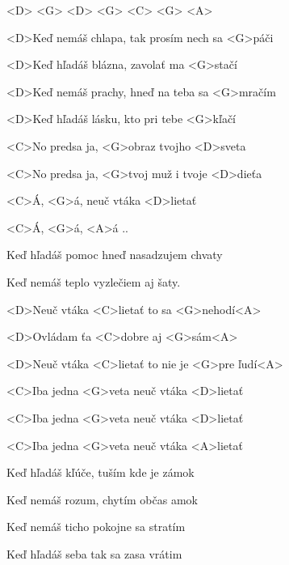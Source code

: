 

\zs
<D> <G> <D> <G> <C> <G> <A>

<D>Keď nemáš chlapa, tak prosím nech sa <G>páči

<D>Keď hľadáš blázna, zavolať ma <G>stačí

<D>Keď nemáš prachy, hneď na teba sa <G>mračím

<D>Keď hľadáš lásku, kto pri tebe <G>kľačí
\ks

\zr
<C>No predsa ja, <G>obraz tvojho <D>sveta

<C>No predsa ja, <G>tvoj muž i tvoje <D>dieťa

<C>Á, <G>á, neuč vtáka <D>lietať

<C>Á, <G>á, <A>á ..
\kr

\zs
Keď hľadáš pomoc hneď nasadzujem chvaty

Keď nemáš teplo vyzlečiem aj šaty.
\ks

\zr
<D>Neuč vtáka <C>lietať to sa <G>nehodí<A> 

<D>Ovládam ťa <C>dobre aj <G>sám<A>

<D>Neuč vtáka <C>lietať to nie je <G>pre ľudí<A> 

<C>Iba jedna <G>veta neuč vtáka <D>lietať

<C>Iba jedna <G>veta neuč vtáka <D>lietať

<C>Iba jedna <G>veta neuč vtáka <A>lietať
\kr

\zs
Keď hľadáš kľúče, tuším kde je zámok

Keď nemáš rozum, chytím občas amok

Keď nemáš ticho pokojne sa stratím

Keď hľadáš seba tak sa zasa vrátim
\ks

\zr \kr

\kp
